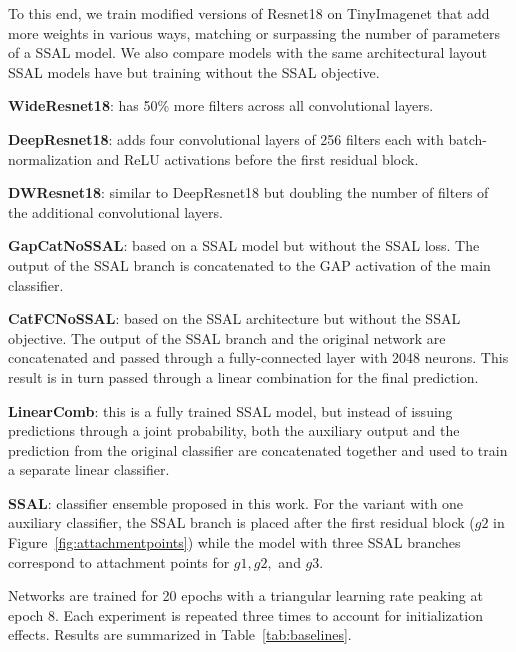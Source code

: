 \documentclass[10pt,twocolumn,letterpaper]{article}
\begin{document}
To this end, we train modified versions of Resnet18 on TinyImagenet that add more weights in various ways, matching or surpassing the number of parameters of a SSAL model.
We also compare models with the same architectural layout SSAL models have but training without the SSAL objective.

\textbf{WideResnet18}: has 50\% more filters across all convolutional layers.

\textbf{DeepResnet18}: adds four convolutional layers of 256 filters each with batch-normalization and ReLU activations before the first residual block.

\textbf{DWResnet18}: similar to DeepResnet18 but doubling the number of filters of the additional convolutional layers.

\textbf{GapCatNoSSAL}: based on a SSAL model but without the SSAL loss.
The output of the SSAL branch is concatenated to the GAP activation of the main classifier.

\textbf{CatFCNoSSAL}: based on the SSAL architecture but without the SSAL objective.
The output of the SSAL branch and the original network are concatenated and passed through a fully-connected layer with 2048 neurons.
This result is in turn passed through a linear combination for the final prediction.


\textbf{LinearComb}: this is a fully trained SSAL model, but instead of issuing predictions through a joint probability, both the auxiliary output and the prediction from the original classifier are concatenated together and used to train a separate linear classifier.


\textbf{SSAL}: classifier ensemble proposed in this work.
For the variant with one auxiliary classifier, the SSAL branch is placed after the first residual block ($g2$ in Figure~\ref{fig:attachmentpoints}) while the model with three SSAL branches correspond to attachment points for $g1, g2,$ and $g3$.

Networks are trained for 20 epochs with a triangular learning rate peaking at epoch 8.
Each experiment is repeated three times to account for initialization effects.
Results are summarized in Table~\ref{tab:baselines}.
\end{document}
